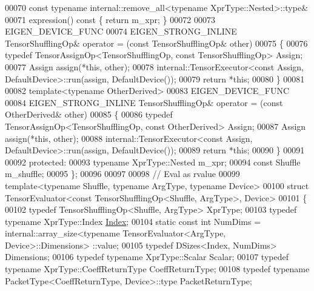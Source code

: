 \begin{DoxyCode}
00070     \textcolor{keyword}{const} \textcolor{keyword}{typename} internal::remove\_all<typename XprType::Nested>::type&
00071     expression()\textcolor{keyword}{ const }\{ \textcolor{keywordflow}{return} m\_xpr; \}
00072 
00073     EIGEN\_DEVICE\_FUNC
00074     EIGEN\_STRONG\_INLINE TensorShufflingOp& operator = (\textcolor{keyword}{const} TensorShufflingOp& other)
00075     \{
00076       \textcolor{keyword}{typedef} TensorAssignOp<TensorShufflingOp, const TensorShufflingOp> Assign;
00077       Assign assign(*\textcolor{keyword}{this}, other);
00078       internal::TensorExecutor<const Assign, DefaultDevice>::run(assign, DefaultDevice());
00079       \textcolor{keywordflow}{return} *\textcolor{keyword}{this};
00080     \}
00081 
00082     \textcolor{keyword}{template}<\textcolor{keyword}{typename} OtherDerived>
00083     EIGEN\_DEVICE\_FUNC
00084     EIGEN\_STRONG\_INLINE TensorShufflingOp& operator = (\textcolor{keyword}{const} OtherDerived& other)
00085     \{
00086       \textcolor{keyword}{typedef} TensorAssignOp<TensorShufflingOp, const OtherDerived> Assign;
00087       Assign assign(*\textcolor{keyword}{this}, other);
00088       internal::TensorExecutor<const Assign, DefaultDevice>::run(assign, DefaultDevice());
00089       \textcolor{keywordflow}{return} *\textcolor{keyword}{this};
00090     \}
00091 
00092   \textcolor{keyword}{protected}:
00093     \textcolor{keyword}{typename} XprType::Nested m\_xpr;
00094     \textcolor{keyword}{const} Shuffle m\_shuffle;
00095 \};
00096 
00097 
00098 \textcolor{comment}{// Eval as rvalue}
00099 \textcolor{keyword}{template}<\textcolor{keyword}{typename} Shuffle, \textcolor{keyword}{typename} ArgType, \textcolor{keyword}{typename} Device>
00100 \textcolor{keyword}{struct }TensorEvaluator<const TensorShufflingOp<Shuffle, ArgType>, Device>
00101 \{
00102   \textcolor{keyword}{typedef} TensorShufflingOp<Shuffle, ArgType> XprType;
00103   \textcolor{keyword}{typedef} \textcolor{keyword}{typename} XprType::Index \hyperlink{namespace_eigen_a62e77e0933482dafde8fe197d9a2cfde}{Index};
00104   \textcolor{keyword}{static} \textcolor{keyword}{const} \textcolor{keywordtype}{int} NumDims = internal::array\_size<typename TensorEvaluator<ArgType, Device>::Dimensions>
      ::value;
00105   \textcolor{keyword}{typedef} DSizes<Index, NumDims> Dimensions;
00106   \textcolor{keyword}{typedef} \textcolor{keyword}{typename} XprType::Scalar Scalar;
00107   \textcolor{keyword}{typedef} \textcolor{keyword}{typename} XprType::CoeffReturnType CoeffReturnType;
00108   \textcolor{keyword}{typedef} \textcolor{keyword}{typename} PacketType<CoeffReturnType, Device>::type PacketReturnType;

\end{DoxyCode}
